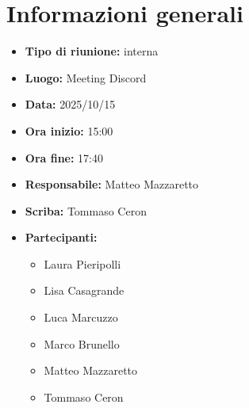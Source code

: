 \section{Informazioni generali}

\begin{itemize}
    \item \textbf{Tipo di riunione:} interna
    \item \textbf{Luogo:} Meeting Discord
    \item \textbf{Data:} 2025/10/15
    \item \textbf{Ora inizio:} 15:00
    \item \textbf{Ora fine:} 17:40
    \item \textbf{Responsabile:} Matteo Mazzaretto 
    \item \textbf{Scriba:} Tommaso Ceron
    \item \textbf{Partecipanti:}
    \begin{itemize}
        \renewcommand{\labelitemii}{--}
        \item Laura Pieripolli
        \item Lisa Casagrande
        \item Luca Marcuzzo
        \item Marco Brunello
        \item Matteo Mazzaretto
        \item Tommaso Ceron
    \end{itemize}
\end{itemize}